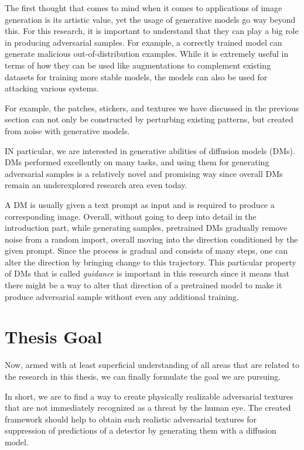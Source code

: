 The first thought that comes to mind when it comes to applications of image generation is its artistic value, yet the usage of generative models go way beyond this.
For this research, it is important to understand that they can play a big role in producing adversarial samples.
For example, a correctly trained model can generate malicious out-of-distribution examples. 
While it is extremely useful in terms of how they can be used like augmentations to complement existing datasets for training more stable models, the models can also be used for attacking various systems.

For example, the patches, stickers, and textures we have discussed in the previous section can not only be constructed by perturbing existing patterns, but created from noise with generative models.

IN particular, we are interested in generative abilities of diffusion models (DMs).
DMs performed excellently on many tasks, and using them for generating adversarial samples is a relatively novel and promising way since overall DMs remain an underexplored research area even today.

A DM is usually given a text prompt as input and is required to produce a corresponding image.
Overall, without going to deep into detail in the introduction part, while generating samples, pretrained DMs gradually remove noise from a random import, overall moving into the direction conditioned by the given prompt.
Since the process is gradual and consists of many steps, one can alter the direction by bringing change to this trajectory.
This particular property of DMs that is called \textit{guidance} is important in this research since it means that there might be a way to alter that direction of a pretrained model to make it produce adversarial sample without even any additional training.


\section{Thesis Goal}

Now, armed with at least superficial understanding of all areas that are related to the research in this thesis, we can finally formulate the goal we are pursuing.

In short, we are to find a way to create physically realizable adversarial textures that are not immediately recognized as a threat by the human eye.
The created framework should help to obtain such realistic adversarial textures for suppression of predictions of a detector by generating them with a diffusion model.

